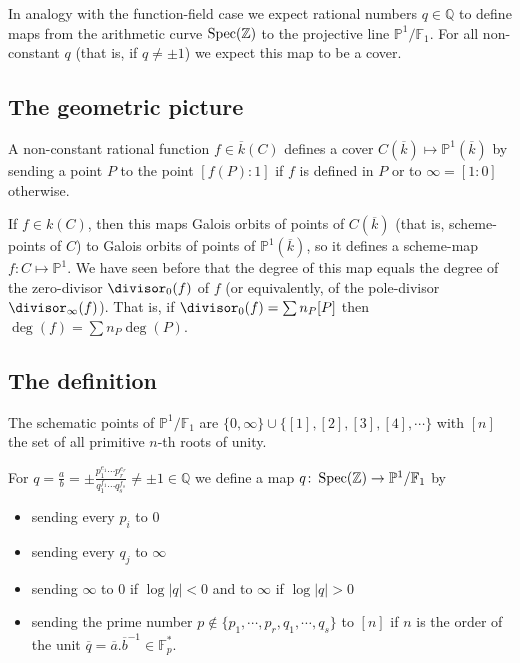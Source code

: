 In analogy with the function-field case we expect rational numbers $q \in \mathbb{Q}$ to define maps from the arithmetic curve $\operatorname{Spec}(\mathbb{Z})$ to the projective line $\mathbb{P}^1 / \mathbb{F}_1$. For all non-constant $q$ (that is, if $q \not= \pm 1$) we expect this map to be a cover.

\subsection{The geometric picture}

A non-constant rational function $f \in \overline{k}(C)$ defines a cover $C(\overline{k}) \mapsto \mathbb{P}^1(\overline{k})$ by sending a point $P$ to the point $[f(P):1]$ if $f$ is defined in $P$ or to $\infty = [1 : 0]$ otherwise.

If $f \in k(C)$, then this maps Galois orbits of points of $C(\overline{k})$ (that is, scheme-points of $C$) to Galois orbits of points of $\mathbb{P}^1(\overline{k})$, so it defines a scheme-map $f\colon C \mapsto \mathbb{P}^1$. We have seen before that the degree of this map equals the degree of the zero-divisor $\divisor_0(f)$ of $f$ (or equivalently, of the pole-divisor $\divisor_{\infty}(f)$). That is, if $\divisor_0(f) = \sum n_P [P]$ then $\deg(f)=\sum n_P \deg(P)$.

\subsection{The definition}

The schematic points of $\mathbb{P}^1 / \mathbb{F}_1$ are $\{ 0,\infty \} \cup \{ [1],[2],[3],[4],\cdots \}$ with $[n]$ the set of all primitive $n$-th roots of unity.

For $q = \frac{a}{b} = \pm \frac{p_1^{e_1} \cdots p_r^{e_r}}{q_1^{f_1} \cdots q_s^{f_s}} \not= \pm 1 \in \mathbb{Q}$ we define a map $q\colon\operatorname{Spec}(\mathbb{Z}) \rightarrow \mathbb{P}^1 / \mathbb{F}_1$ by
\begin{itemize}
  \item sending every $p_i$ to $0$ 
  \item sending every $q_j$ to $\infty$
  \item sending $\infty$ to $0$ if $\log |q| < 0$ and to $\infty$ if $\log |q| > 0$
  \item sending the prime number $p \notin \{ p_1,\cdots,p_r,q_1,\cdots,q_s \}$ to $[n]$ if $n$ is the order of the unit $\overline{q} = \overline{a}.\overline{b}^{-1} \in \mathbb{F}_p^*$.
\end{itemize}

